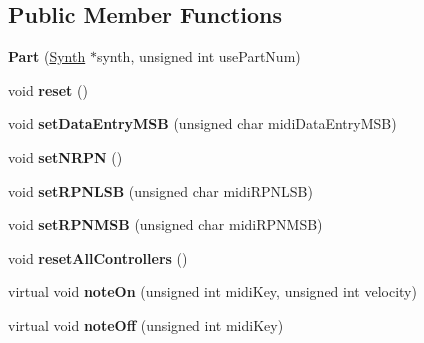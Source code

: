 \subsection*{Public Member Functions}
\begin{DoxyCompactItemize}
\item 
\hypertarget{classMT32Emu_1_1Part_ab9a9ad6219183323e80e6bb24dbbdfec}{{\bfseries Part} (\hyperlink{classMT32Emu_1_1Synth}{Synth} $\ast$synth, unsigned int use\-Part\-Num)}\label{classMT32Emu_1_1Part_ab9a9ad6219183323e80e6bb24dbbdfec}

\item 
\hypertarget{classMT32Emu_1_1Part_a173808f6ad5a9791b0364dc0cbede8ec}{void {\bfseries reset} ()}\label{classMT32Emu_1_1Part_a173808f6ad5a9791b0364dc0cbede8ec}

\item 
\hypertarget{classMT32Emu_1_1Part_aebe9c656c99f0b981516744bdd45053e}{void {\bfseries set\-Data\-Entry\-M\-S\-B} (unsigned char midi\-Data\-Entry\-M\-S\-B)}\label{classMT32Emu_1_1Part_aebe9c656c99f0b981516744bdd45053e}

\item 
\hypertarget{classMT32Emu_1_1Part_a79d2c0a6c953ec1c6a3713a2e3c89b63}{void {\bfseries set\-N\-R\-P\-N} ()}\label{classMT32Emu_1_1Part_a79d2c0a6c953ec1c6a3713a2e3c89b63}

\item 
\hypertarget{classMT32Emu_1_1Part_a06f0226c13f18d72dc14c90bac20e802}{void {\bfseries set\-R\-P\-N\-L\-S\-B} (unsigned char midi\-R\-P\-N\-L\-S\-B)}\label{classMT32Emu_1_1Part_a06f0226c13f18d72dc14c90bac20e802}

\item 
\hypertarget{classMT32Emu_1_1Part_a0e39602d144211cc71b797f84a56231d}{void {\bfseries set\-R\-P\-N\-M\-S\-B} (unsigned char midi\-R\-P\-N\-M\-S\-B)}\label{classMT32Emu_1_1Part_a0e39602d144211cc71b797f84a56231d}

\item 
\hypertarget{classMT32Emu_1_1Part_a35b766410586cc74764b6038f0247ddc}{void {\bfseries reset\-All\-Controllers} ()}\label{classMT32Emu_1_1Part_a35b766410586cc74764b6038f0247ddc}

\item 
\hypertarget{classMT32Emu_1_1Part_ae11a0ff355dea8b233b16dfb9764442d}{virtual void {\bfseries note\-On} (unsigned int midi\-Key, unsigned int velocity)}\label{classMT32Emu_1_1Part_ae11a0ff355dea8b233b16dfb9764442d}

\item 
\hypertarget{classMT32Emu_1_1Part_a26a452268b1a98a054e5ad2908dba2f0}{virtual void {\bfseries note\-Off} (unsigned int midi\-Key)}\label{classMT32Emu_1_1Part_a26a452268b1a98a054e5ad2908dba2f0}


\end{DoxyCompactItemize}
